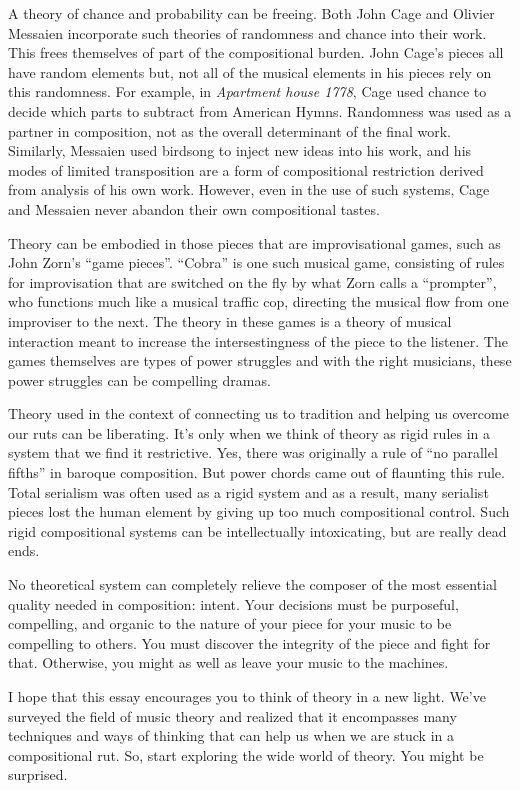 \documentclass[
]{book}
\begin{document}
A theory of chance and probability can be freeing. Both John Cage and Olivier Messaien incorporate such theories of randomness and chance into their work. This frees themselves of part of the compositional burden. John Cage's pieces all have random elements but, not all of the musical elements in his pieces rely on this randomness. For example, in \emph{Apartment house 1778}, Cage used chance to decide which parts to subtract from American Hymns. Randomness was used as a partner in composition, not as the overall determinant of the final work. Similarly, Messaien used birdsong to inject new ideas into his work, and his modes of limited transposition are a form of compositional restriction derived from analysis of his own work. However, even in the use of such systems, Cage and Messaien never abandon their own compositional tastes.

Theory can be embodied in those pieces that are improvisational games, such as John Zorn's ``game pieces''. ``Cobra'' is one such musical game, consisting of rules for improvisation that are switched on the fly by what Zorn calls a ``prompter'', who functions much like a musical traffic cop, directing the musical flow from one improviser to the next. The theory in these games is a theory of musical interaction meant to increase the intersestingness of the piece to the listener. The games themselves are types of power struggles and with the right musicians, these power struggles can be compelling dramas.

Theory used in the context of connecting us to tradition and helping us overcome our ruts can be liberating. It's only when we think of theory as rigid rules in a system that we find it restrictive. Yes, there was originally a rule of ``no parallel fifths'' in baroque composition. But power chords came out of flaunting this rule. Total serialism was often used as a rigid system and as a result, many serialist pieces lost the human element by giving up too much compositional control. Such rigid compositional systems can be intellectually intoxicating, but are really dead ends.

No theoretical system can completely relieve the composer of the most essential quality needed in composition: intent. Your decisions must be purposeful, compelling, and organic to the nature of your piece for your music to be compelling to others. You must discover the integrity of the piece and fight for that. Otherwise, you might as well as leave your music to the machines.

I hope that this essay encourages you to think of theory in a new light. We've surveyed the field of music theory and realized that it encompasses many techniques and ways of thinking that can help us when we are stuck in a compositional rut. So, start exploring the wide world of theory. You might be surprised.
\end{document}
